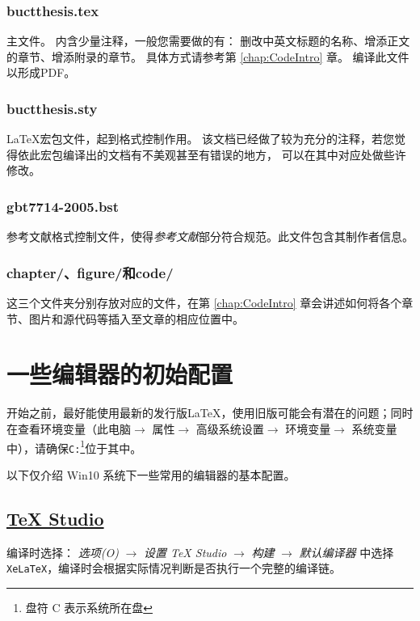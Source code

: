 		\subsubsection{\textsf{buctthesis.tex}}主文件。
		内含少量注释，一般您需要做的有：
		删改中英文标题的名称、增添正文的章节、增添附录的章节。
		具体方式请参考第 \ref{chap:CodeIntro} 章。
		编译此文件以形成PDF。
		\subsubsection{\textsf{buctthesis.sty}}
		\LaTeX{}宏包文件，起到格式控制作用。
		该文档已经做了较为充分的注释，若您觉得依此宏包编译出的文档有不美观甚至有错误的地方，
		可以在其中对应处做些许修改。
		\subsubsection{\textsf{gbt7714-2005.bst}}
		参考文献格式控制文件，使得\emph{参考文献}部分符合规范。此文件包含其制作者信息。
		\subsubsection{\textsf{chapter/}、\textsf{figure/}和\textsf{code/}}
		这三个文件夹分别存放对应的文件，在第 \ref{chap:CodeIntro} 章会讲述如何将各个章节、图片和源代码等插入至文章的相应位置中。

	\section{一些编辑器的初始配置}
		开始之前，最好能使用最新的发行版\LaTeX{}，使用旧版可能会有潜在的问题；同时在查看环境变量（此电脑$\rightarrow$ 属性$\rightarrow$ 高级系统设置$\rightarrow$ 环境变量$\rightarrow$ 系统变量\,中），请确保\texttt{C:}\footnote{盘符 C 表示系统所在盘}位于其中。

		以下仅介绍 Win10 系统下一些常用的编辑器的基本配置。
		\subsection{\href{http://texstudio.sourceforge.net}{\TeX{} Studio}}
			编译时选择\XeLaTeX{}：
			\emph{选项(O)} $\rightarrow$ \emph{设置 TeX Studio} $\rightarrow$ \emph{构建} $\rightarrow$ \emph{默认编译器} 中选择\texttt{XeLaTeX}，编译时会根据实际情况判断是否执行一个完整的编译链。

